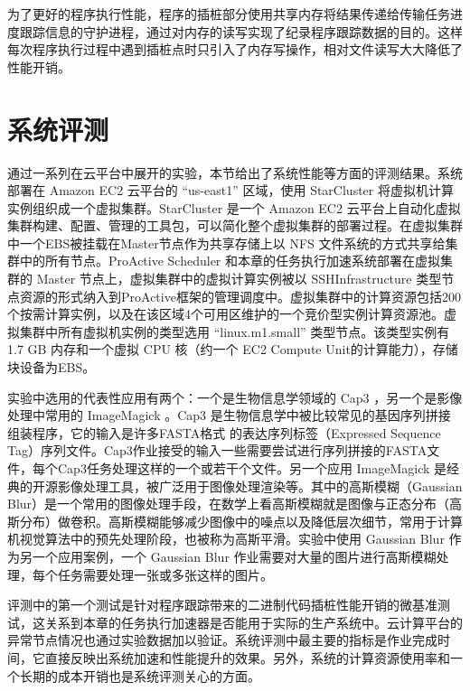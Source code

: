 为了更好的程序执行性能，程序的插桩部分使用共享内存将结果传递给传输任务进度跟踪信息的守护进程，通过对内存的读写实现了纪录程序跟踪数据的目的。这样每次程序执行过程中遇到插桩点时只引入了内存写操作，相对文件读写大大降低了性能开销。

\section{系统评测}
\label{sec:no2_eval}
通过一系列在云平台中展开的实验，本节给出了系统性能等方面的评测结果。系统部署在 Amazon EC2 云平台的 ``us-east1'' 区域，使用 StarCluster \cite{starcluster} 将虚拟机计算实例组织成一个虚拟集群。StarCluster \cite{starcluster} 是一个 Amazon EC2 云平台上自动化虚拟集群构建、配置、管理的工具包，可以简化整个虚拟集群的部署过程。在虚拟集群中一个EBS被挂载在Master节点作为共享存储上以 NFS 文件系统的方式共享给集群中的所有节点。ProActive Scheduler 和本章的任务执行加速系统部署在虚拟集群的 Master 节点上，虚拟集群中的虚拟计算实例被以 SSHInfrastructure 类型节点资源的形式纳入到ProActive框架的管理调度中。虚拟集群中的计算资源包括200个按需计算实例，以及在该区域4个可用区维护的一个竞价型实例计算资源池。虚拟集群中所有虚拟机实例的类型选用 ``linux.m1.small'' 类型节点。该类型实例有 1.7 GB 内存和一个虚拟 CPU 核（约一个 EC2 Compute Unit的计算能力），存储块设备为EBS。

实验中选用的代表性应用有两个：一个是生物信息学领域的 Cap3 \cite{Huang:1999:Cap3}，另一个是影像处理中常用的 ImageMagick \cite{imagemagick}。Cap3 是生物信息学中被比较常见的基因序列拼接组装程序，它的输入是许多FASTA格式 \cite{fasta} 的表达序列标签（Expressed Sequence Tag）序列文件。Cap3作业接受的输入一些需要尝试进行序列拼接的FASTA文件，每个Cap3任务处理这样的一个或若干个文件。另一个应用 ImageMagick 是经典的开源影像处理工具，被广泛用于图像处理渲染等。其中的高斯模糊（Gaussian Blur）是一个常用的图像处理手段，在数学上看高斯模糊就是图像与正态分布（高斯分布）做卷积。高斯模糊能够减少图像中的噪点以及降低层次细节，常用于计算机视觉算法中的预先处理阶段，也被称为高斯平滑。实验中使用 Gaussian Blur 作为另一个应用案例，一个 Gaussian Blur 作业需要对大量的图片进行高斯模糊处理，每个任务需要处理一张或多张这样的图片。

评测中的第一个测试是针对程序跟踪带来的二进制代码插桩性能开销的微基准测试，这关系到本章的任务执行加速器是否能用于实际的生产系统中。云计算平台的异常节点情况也通过实验数据加以验证。系统评测中最主要的指标是作业完成时间，它直接反映出系统加速和性能提升的效果。另外，系统的计算资源使用率和一个长期的成本开销也是系统评测关心的方面。

